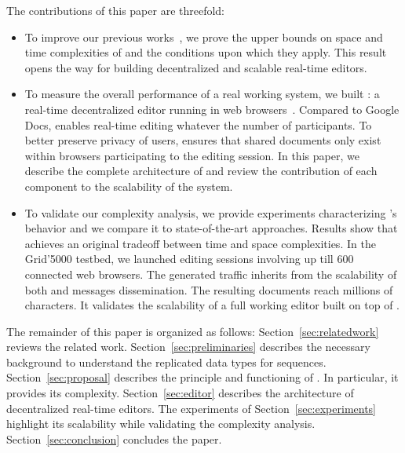 \noindent The contributions of this paper are threefold:
\begin{itemize}[noitemsep, leftmargin=*]
\item To improve our previous works~\cite{nedelec2013concurrency,
    nedelec2013lseq}, we prove the upper bounds on space and time complexities
  of \LSEQ and the conditions upon which they apply. This result opens the way
  for building decentralized and scalable real-time editors.
\item To measure the overall performance of a real working system, we built
  \CRATE: a real-time decentralized editor running in web
  browsers~\cite{nedelec2016crate}. Compared to Google Docs, \CRATE enables
  real-time editing whatever the number of participants. To better preserve
  privacy of users, \CRATE ensures that shared documents only exist within
  browsers participating to the editing session. In this paper, we describe the
  complete architecture of \CRATE and review the contribution of each component
  to the scalability of the system. %
\item To validate our complexity analysis, we provide experiments characterizing
  \LSEQ's behavior and we compare it to state-of-the-art approaches. Results
  show that \LSEQ achieves an original tradeoff between time and space
  complexities. In the Grid'5000 testbed, we launched \CRATE editing sessions
  involving up till 600 connected web browsers. The generated traffic inherits
  from the scalability of both \LSEQ and messages dissemination. The resulting
  documents reach millions of characters. It validates the scalability of a full
  working editor built on top of \LSEQ.
\end{itemize}

The remainder of this paper is organized as follows:
Section~\ref{sec:relatedwork} reviews the related work.
Section~\ref{sec:preliminaries} describes the necessary background to understand
the replicated data types for sequences. Section~\ref{sec:proposal} describes
the principle and functioning of \LSEQ. In particular, it provides its
complexity. Section~\ref{sec:editor} describes the architecture of decentralized
real-time editors. The experiments of Section~\ref{sec:experiments} highlight
its scalability while validating the complexity analysis.
Section~\ref{sec:conclusion} concludes the paper.

